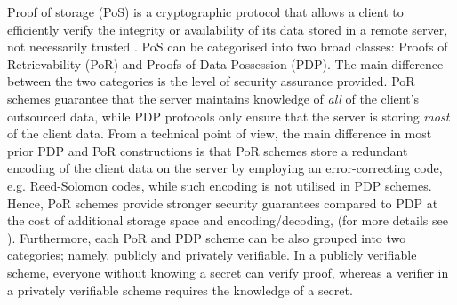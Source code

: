Proof of storage (PoS) is a cryptographic protocol that allows a client to  efficiently verify the integrity or availability of its  data stored in a remote server, not necessarily trusted \cite{DBLP:conf/cai/Kamara13}. PoS  can be categorised into two broad classes:   Proofs of Retrievability (PoR) and Proofs of Data Possession (PDP). The main difference between the two categories is the level of security assurance provided. PoR schemes guarantee that the server maintains knowledge of \emph{all} of the client's outsourced data, while  PDP protocols only ensure that the server is storing \emph{most} of the client data. From a technical point of view,  the main difference in most prior PDP and PoR constructions is that PoR schemes store a redundant encoding of the client data on the server by employing an error-correcting code, e.g. Reed-Solomon codes, while such encoding is not utilised in  PDP schemes. Hence, PoR schemes provide stronger security guarantees compared to PDP at the  cost of additional storage space and encoding/decoding, (for more details see \cite{kupcu2010efficient,DBLP:conf/ccs/ShiSP13,Cash:2017:DPR:3038037.3038087}). Furthermore, each PoR and PDP scheme can be also grouped into two categories; namely, publicly and privately verifiable. In a publicly verifiable scheme, everyone without knowing a secret can verify  proof, whereas a verifier in a privately verifiable scheme requires the knowledge of a secret. 


